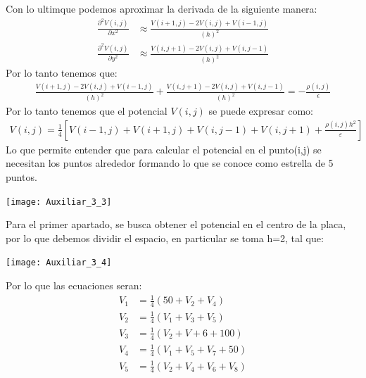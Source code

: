 \documentclass[
  11pt,
  letterpaper,
   addpoints,
   answers
  ]{exam}
\begin{document}
\begin{questions}
\begin{solution}
\begin{enumerate}
            Con lo ultimque podemos aproximar la derivada de la siguiente manera:
            \begin{align}
                \frac{\partial^{2}V(i,j)}{\partial x^{2}} &\approx \frac{V(i+1,j) - 2V(i,j) + V(i-1,j)}{(h)^{2}}\\
                \frac{\partial^{2}V(i,j)}{\partial y^{2}} &\approx \frac{V(i,j+1) - 2V(i,j) + V(i,j-1)}{(h)^{2}}
            \end{align}
            Por lo tanto tenemos que:
            \begin{align}
                \frac{V(i+1,j) - 2V(i,j) + V(i-1,j)}{(h)^{2}} + \frac{V(i,j+1) - 2V(i,j) + V(i,j-1)}{(h)^{2}} = -\frac{\rho(i,j)}{\epsilon}
            \end{align}
            Por lo tanto tenemos que el potencial $V(i,j)$ se puede expresar como:
            \begin{align}
                V(i,j) = \frac{1}{4} \left[ V(i-1,j) + V(i+1,j) + V(i,j-1) + V(i,j+1) + \frac{\rho(i,j)h^2}{\varepsilon} \right]
            \end{align}
            Lo que permite entender que para calcular el potencial en el punto(i,j) se necesitan los puntos alrededor formando lo que se conoce como estrella de 5 puntos.
            \begin{center}
                \texttt{[image: Auxiliar\_3\_3]}
              \end{center}
            Para el primer apartado, se busca obtener el potencial en el centro de la placa, por lo que debemos dividir el espacio, en particular se toma h=2, tal que:
            \begin{center}
                \texttt{[image: Auxiliar\_3\_4]}
              \end{center}
            Por lo que las ecuaciones seran:
            \begin{align}
                V_1 &= \frac{1}{4} \left(50 + V_2 + V_4\right) \\
                V_2 &= \frac{1}{4} \left(V_1 + V_3 + V_5\right) \\
                V_3 &= \frac{1}{4} \left(V_2 + V + 6 + 100\right) \\
                V_4 &= \frac{1}{4} \left(V_1 + V_5 + V_7 + 50\right) \\
                V_5 &= \frac{1}{4} \left(V_2 + V_4 + V_6 + V_8\right) \\

\end{align}
\end{enumerate}
\end{solution}
\end{questions}
\end{document}
